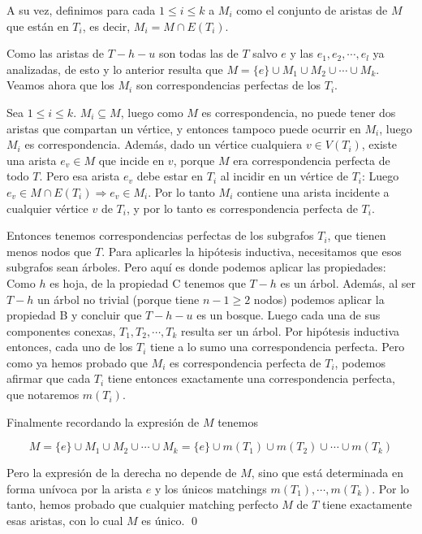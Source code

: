 \documentclass{article}
\begin{document}
A su vez, definimos para cada $1 \leq i \leq k$ a $M_i$ como el conjunto de aristas de $M$ que están en $T_i$, es decir, $M_i = M \cap E(T_i)$.

Como las aristas de $T - h - u$ son todas las de $T$ salvo $e$ y las $e_1, e_2, \cdots, e_l$ ya analizadas, de esto y lo anterior resulta que
$M = \{ e \} \cup M_1 \cup M_2 \cup \cdots \cup M_k$. Veamos ahora que los $M_i$ son correspondencias perfectas de los $T_i$.

Sea $1 \leq i \leq k$. $M_i \subseteq M$, luego como $M$ es correspondencia, no puede tener dos aristas que compartan un vértice, y entonces tampoco
puede ocurrir en $M_i$, luego $M_i$ es correspondencia. Además, dado un vértice cualquiera $v \in V(T_i)$, existe una arista $e_v \in M$ que incide en $v$,
porque $M$ era correspondencia perfecta de todo $T$. Pero esa arista $e_v$ debe estar en $T_i$ al incidir en un vértice de $T_i$: Luego
$e_v \in M \cap E(T_i) \Rightarrow e_v \in M_i$. Por lo tanto $M_i$ contiene una arista incidente a cualquier vértice $v$ de $T_i$, y por lo tanto es
correspondencia perfecta de $T_i$.

Entonces tenemos correspondencias perfectas de los subgrafos $T_i$, que tienen menos nodos que $T$. Para aplicarles la hipótesis inductiva, necesitamos que esos
subgrafos sean árboles. Pero aquí es donde podemos aplicar las propiedades: Como $h$ es hoja, de la propiedad C tenemos que $T - h$ es un árbol.
Además, al ser $T-h$ un árbol no trivial (porque tiene $n-1 \geq 2$ nodos) podemos aplicar la propiedad B y concluir que $T - h - u$ es un bosque.
Luego cada una de sus componentes conexas, $T_1, T_2, \cdots, T_k$ resulta ser un árbol. Por hipótesis inductiva entonces, cada uno de los $T_i$
tiene a lo sumo una correspondencia perfecta. Pero como ya hemos probado que $M_i$ es correspondencia perfecta de $T_i$, podemos afirmar que cada
$T_i$ tiene entonces exactamente una correspondencia perfecta, que notaremos $m(T_i)$.

Finalmente recordando la expresión de $M$ tenemos

$$M = \{ e \} \cup M_1 \cup M_2 \cup \cdots \cup M_k = \{ e \} \cup m(T_1) \cup m(T_2) \cup \cdots \cup m(T_k)$$

Pero la expresión de la derecha no depende de $M$, sino que está determinada en forma unívoca por la arista $e$ y los únicos matchings $m(T_1), \cdots, m(T_k)$.
Por lo tanto, hemos probado que cualquier matching perfecto $M$ de $T$ tiene exactamente esas aristas, con lo cual $M$ es único. \qed
\end{document}
